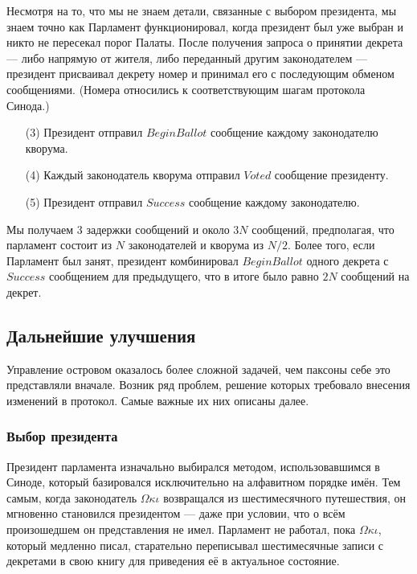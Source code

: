 \documentclass[12pt, a4paper]{article} %
\begin{document}
Несмотря на то, что мы не знаем детали, связанные с выбором президента, мы знаем точно как Парламент функционировал, когда президент был уже выбран и никто не пересекал порог Палаты. После  получения запроса о принятии декрета --- либо напрямую от жителя, либо переданный другим законодателем --- президент присваивал декрету номер и принимал его с последующим обменом сообщениями. (Номера относились к соответствующим шагам протокола Синода.) 
\begin{itemize}
    \item[(3)] Президент отправил $BeginBallot$ сообщение каждому законодателю кворума.
    \item[(4)] Каждый законодатель кворума отправил $Voted$ сообщение президенту.
    \item[(5)] Президент отправил $Success$ сообщение каждому законодателю.
\end{itemize}

Мы получаем 3 задержки сообщений и около $3N$ сообщений, предполагая, что парламент состоит из $N$ законодателей и кворума из $N/2$. Более того, если Парламент был занят, президент  комбинировал $BeginBallot$ одного декрета с $Success$ сообщением для предыдущего, что в итоге было равно $2N$ сообщений на декрет.

\subsection{Дальнейшие улучшения}\label{sec:dev}

Управление островом оказалось более сложной задачей, чем паксоны себе это представляли вначале. Возник ряд проблем, решение которых требовало внесения изменений в протокол. Самые важные их них описаны далее.

\subsubsection{Выбор президента}

Президент парламента изначально выбирался методом, использовавшимся в Синоде, который базировался исключительно на алфавитном порядке имён. Тем самым, когда законодатель $\Omega\kappa\iota$ возвращался из шестимесячного путешествия, он мгновенно становился президентом --- даже при условии, что о всём произошедшем он представления не имел. Парламент не работал, пока $\Omega\kappa\iota$, который медленно писал, старательно переписывал шестимесячные записи с декретами в свою книгу для приведения её в актуальное состояние.
\end{document}
